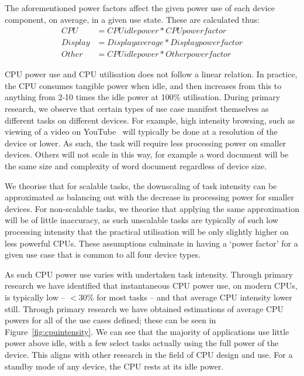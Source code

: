 \documentclass[conference]{IEEEtran}
\begin{document}
The aforementioned power factors affect the given power use of each
device component, on average, in a given use state. These are
calculated thus:
\begin{align*}
CPU &= CPU idle power * CPU power factor\\
Display &= Display average * Display power factor\\
Other &= CPU idle power * Other power factor
\end{align*}

CPU power use and CPU utilisation does not follow a linear
relation. In practice, the CPU consumes tangible power when idle, and
then increases from this to anything from 2-10 times the idle power at
100\% utilisation. During primary research, we observe that certain
types of use case manifest themselves as different tasks on different
devices. For example, high intensity browsing, such as viewing of a
video on YouTube~\cite{schien-et-al:2013} will typically be done at a
resolution of the device or lower. As such, the task will require less
processing power on smaller devices. Others will not scale in this
way, for example a word document will be the same size and complexity
of word document regardless of device size.

We theorise that for scalable tasks, the downscaling of task
intensity can be approximated as balancing out with the decrease in
processing power for smaller devices. For non-scalable tasks, we
theorise that applying the same approximation will be of
little inaccuracy, as such unscalable tasks are typically of such low
processing intensity that the practical utilisation will be only
slightly higher on less powerful CPUs.  These assumptions culminate in
having a `power factor' for a given use case that is common to all
four device types.

As such CPU power use varies with undertaken task intensity.
Through primary research we have identified that
instantaneous CPU power use, on modern CPUs, is typically low --
$<$30\% for most tasks -- and that average CPU intensity lower
still. Through primary research we have obtained estimations of
average CPU powers for all of the use cases defined; these can be seen
in Figure~\ref{fig:cpuintensity}. We can see that the majority of
applications use little power above idle, with a few select tasks
actually using the full power of the device. This aligns with other
research in the field of CPU design and use. For a standby mode of any
device, the CPU rests at its idle power.
\end{document}
